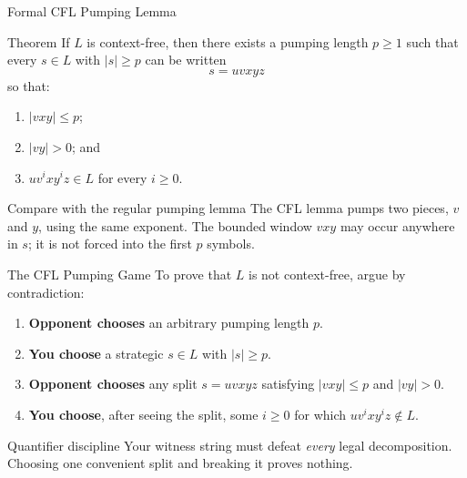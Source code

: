 \documentclass[10pt]{beamer}
\begin{document}
\begin{frame}{Formal CFL Pumping Lemma}
  \small
  \begin{block}{Theorem}
    If $L$ is context-free, then there exists a pumping length $p\ge1$ such that every
    $s\in L$ with $|s|\ge p$ can be written
    \[
      s=uvxyz
    \]
    so that:
    \begin{enumerate}
      \item $|vxy|\le p$;
      \item $|vy|>0$; and
      \item $uv^ixy^iz\in L$ for every $i\ge0$.
    \end{enumerate}
  \end{block}
  \pause
  \begin{alertblock}{Compare with the regular pumping lemma}
    The CFL lemma pumps two pieces, $v$ and $y$, using the same exponent. The bounded window $vxy$
    may occur anywhere in $s$; it is not forced into the first $p$ symbols.
  \end{alertblock}
\end{frame}

\begin{frame}{The CFL Pumping Game}
  To prove that $L$ is not context-free, argue by contradiction:
  \begin{enumerate}
    \item \textbf{Opponent chooses} an arbitrary pumping length $p$.
    \item \textbf{You choose} a strategic $s\in L$ with $|s|\ge p$.
    \pause
    \item \textbf{Opponent chooses} any split $s=uvxyz$ satisfying
      $|vxy|\le p$ and $|vy|>0$.
    \pause
    \item \textbf{You choose}, after seeing the split, some $i\ge0$ for which
      $uv^ixy^iz\notin L$.
  \end{enumerate}
  \begin{alertblock}{Quantifier discipline}
    Your witness string must defeat \emph{every} legal decomposition. Choosing one convenient split
    and breaking it proves nothing.
  \end{alertblock}
\end{frame}
\end{document}
